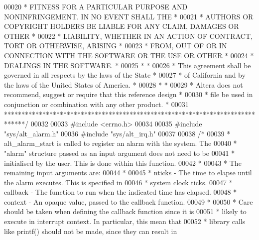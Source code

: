 \begin{DoxyCode}
00020 \textcolor{comment}{* FITNESS FOR A PARTICULAR PURPOSE AND NONINFRINGEMENT. IN NO EVENT SHALL THE *}
00021 \textcolor{comment}{* AUTHORS OR COPYRIGHT HOLDERS BE LIABLE FOR ANY CLAIM, DAMAGES OR OTHER      *}
00022 \textcolor{comment}{* LIABILITY, WHETHER IN AN ACTION OF CONTRACT, TORT OR OTHERWISE, ARISING     *}
00023 \textcolor{comment}{* FROM, OUT OF OR IN CONNECTION WITH THE SOFTWARE OR THE USE OR OTHER         *}
00024 \textcolor{comment}{* DEALINGS IN THE SOFTWARE.                                                   *}
00025 \textcolor{comment}{*                                                                             *}
00026 \textcolor{comment}{* This agreement shall be governed in all respects by the laws of the State   *}
00027 \textcolor{comment}{* of California and by the laws of the United States of America.              *}
00028 \textcolor{comment}{*                                                                             *}
00029 \textcolor{comment}{* Altera does not recommend, suggest or require that this reference design    *}
00030 \textcolor{comment}{* file be used in conjunction or combination with any other product.          *}
00031 \textcolor{comment}{******************************************************************************/}
00032 
00033 \textcolor{preprocessor}{#include <errno.h>}
00034 
00035 \textcolor{preprocessor}{#include "sys/alt_alarm.h"}
00036 \textcolor{preprocessor}{#include "sys/alt_irq.h"}
00037 
00038 \textcolor{comment}{/*}
00039 \textcolor{comment}{ * alt\_alarm\_start is called to register an alarm with the system. The }
00040 \textcolor{comment}{ * "alarm" structure passed as an input argument does not need to be }
00041 \textcolor{comment}{ * initialised by the user. This is done within this function.}
00042 \textcolor{comment}{ *}
00043 \textcolor{comment}{ * The remaining input arguments are:}
00044 \textcolor{comment}{ *}
00045 \textcolor{comment}{ * nticks - The time to elapse until the alarm executes. This is specified in}
00046 \textcolor{comment}{ *          system clock ticks.}
00047 \textcolor{comment}{ * callback - The function to run when the indicated time has elapsed.}
00048 \textcolor{comment}{ * context  - An opaque value, passed to the callback function. }
00049 \textcolor{comment}{*}
00050 \textcolor{comment}{ * Care should be taken when defining the callback function since it is }
00051 \textcolor{comment}{ * likely to execute in interrupt context. In particular, this mean that }
00052 \textcolor{comment}{ * library calls like printf() should not be made, since they can result in }

\end{DoxyCode}
